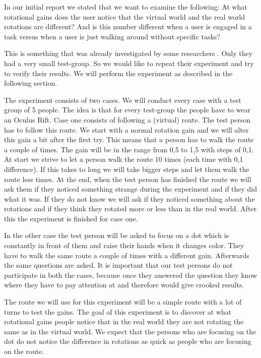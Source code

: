 In our initial report we stated that we want to examine the following:
At what rotational gains does the user notice that the virtual world and the real world rotations are different?
And is this number different when a user is engaged in a task versus when a user is just walking around without specific tasks?

This is something that was already investigated by some researchers \cite{steinicke2}. 
Only they had a very small test-group. 
So we would like to repeat their experiment and try to verify their results. 
We will perform the experiment as described in the following section.

The experiment consists of two cases. 
We will conduct every case with a test group of 5 people. 
The idea is that for every test-group the people have to wear an Oculus Rift. 
Case one consists of following a (virtual) route. 
The test person has to follow this route. 
We start with a normal rotation gain and we will alter this gain a bit after the first try. 
This means that a person has to walk the route a couple of times. 
The gain will be in the range from 0,5 to 1,5 with steps of 0,1. 
At start we strive to let a person walk the route 10 times (each time with 0,1 difference). 
If this takes to long we will take bigger steps and let them walk the route less times. 
At the end, when the test person has finished the route we will ask them if they noticed something strange during the experiment and if they did what it was. 
If they do not know we will ask if they noticed something about the rotations and if they think they rotated more or less than in the real world. 
After this the experiment is finished for case one.

In the other case the test person will be asked to focus on a dot which is constantly in front of them and raise their hands when it changes color. 
They have to walk the same route a couple of times with a different gain. 
Afterwards the same questions are asked. 
It is important that our test persons do not participate in both the cases, because once they answered the question they know where they have to pay attention at and therefore would give crooked results.

The route we will use for this experiment will be a simple route with a lot of turns to test the gains. 
The goal of this experiment is to discover at what rotational gains people notice that in the real world they are not rotating the same as in the virtual world. 
We expect that the persons who are focusing on the dot do not notice the difference in rotations as quick as people who are focusing on the route. 

